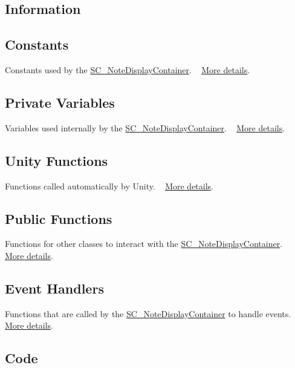 \hypertarget{group___doc_s_c___n_d_c_DocSC_NDCInfo}{}\subsection{Information}\label{group___doc_s_c___n_d_c_DocSC_NDCInfo}
\hypertarget{group___doc_s_c___n_d_c_DocSC_NDCConst}{}\subsection{Constants}\label{group___doc_s_c___n_d_c_DocSC_NDCConst}
Constants used by the \hyperlink{class_s_c___note_display_container}{S\+C\+\_\+\+Note\+Display\+Container}. ~\newline
 \hyperlink{group___s_c___n_d_c_const}{More details}.\hypertarget{group___doc_s_c___n_d_c_DocSC_NDCPrivVar}{}\subsection{Private Variables}\label{group___doc_s_c___n_d_c_DocSC_NDCPrivVar}
Variables used internally by the \hyperlink{class_s_c___note_display_container}{S\+C\+\_\+\+Note\+Display\+Container}. ~\newline
 \hyperlink{group___s_c___n_d_c_priv_var}{More details}.\hypertarget{group___doc_s_c___n_d_c_DocSC_NDCUnity}{}\subsection{Unity Functions}\label{group___doc_s_c___n_d_c_DocSC_NDCUnity}
Functions called automatically by Unity. ~\newline
 \hyperlink{group___s_c___n_d_c_unity}{More details}.\hypertarget{group___doc_s_c___n_d_c_DocSC_NDCPubFunc}{}\subsection{Public Functions}\label{group___doc_s_c___n_d_c_DocSC_NDCPubFunc}
Functions for other classes to interact with the \hyperlink{class_s_c___note_display_container}{S\+C\+\_\+\+Note\+Display\+Container}. ~\newline
 \hyperlink{group___s_c___n_d_c_pub_func}{More details}.\hypertarget{group___doc_s_c___n_d_c_DocSC_NDCHandlers}{}\subsection{Event Handlers}\label{group___doc_s_c___n_d_c_DocSC_NDCHandlers}
Functions that are called by the \hyperlink{class_s_c___note_display_container}{S\+C\+\_\+\+Note\+Display\+Container} to handle events. ~\newline
 \hyperlink{group___s_c___n_d_c_handlers}{More details}.\hypertarget{group___doc_s_c___n_d_c_DocSC_NDCCode}{}\subsection{Code}\label{group___doc_s_c___n_d_c_DocSC_NDCCode}

